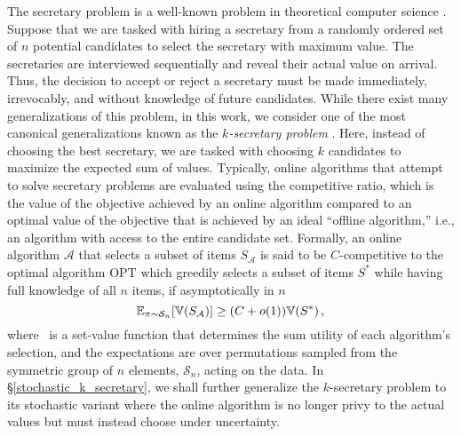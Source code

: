 The secretary problem is a well-known problem in theoretical computer science \cite{dynkin1963optimum,ferguson1989solved}. Suppose that we are tasked with hiring a secretary from a randomly ordered set of $n$ potential candidates to select the secretary with maximum value. The secretaries are interviewed sequentially and reveal their actual value on arrival. Thus, the decision to accept or reject a secretary must be made immediately, irrevocably, and without knowledge of future candidates. While there exist many generalizations of this problem, in this work, we consider one of the most canonical generalizations known as the \textit{$k$-secretary problem} \cite{kleinberg2005multiple}. Here, instead of choosing the best secretary, we are tasked with choosing $k$ candidates to maximize the expected sum of values. Typically, online algorithms that attempt to solve secretary problems are evaluated using the competitive ratio, which is the value of the objective achieved by an online algorithm compared to an optimal value of the objective that is achieved by an ideal ``offline algorithm,” i.e., an algorithm with access to the entire candidate set. Formally, an online algorithm $\mathcal{A}$ that selects a subset of items $S_{\mathcal{A}}$  is said to be $C$-competitive to the optimal algorithm $\textrm{OPT}$ which greedily selects a subset of items $S^*$ while having full knowledge of all $n$ items, if asymptotically in $n$
\begin{equation}
    \mathbb{E}_{\pi\sim \mathcal{S}_n}[\mathbb{V}(S_{\mathcal{A}})] \geq  (C + o(1)) \mathbb{V}(S^*) \,,
    \label{eq:comp_ration}
\end{equation}
where \setvalue\ is a set-value function that determines the sum utility of each algorithm's selection, and the expectations are over permutations sampled from the symmetric group of $n$ elements, $\mathcal{S}_n$, acting on the data. In \S\ref{stochastic_k_secretary}, we shall further generalize the $k$-secretary problem to its stochastic variant where the online algorithm is no longer privy to the actual values but must instead choose under uncertainty.




